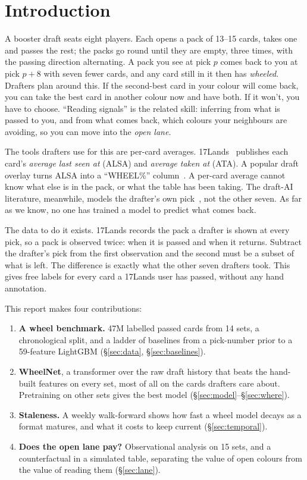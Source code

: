 \documentclass[10pt,letterpaper]{article}
\begin{document}
\section{Introduction}

A booster draft seats eight players. Each opens a pack of 13--15 cards, takes one and passes the rest; the
packs go round until they are empty, three times, with the passing direction alternating. A pack you see at
pick $p$ comes back to you at pick $p+8$ with seven fewer cards, and any card still in it then has
\emph{wheeled}. Drafters plan around this. If the second-best card in your colour will come back, you can take the
best card in another colour now and have both. If it won't, you have to choose. ``Reading signals'' is the
related skill: inferring from what is passed to you, and from what comes back, which colours your neighbours are
avoiding, so you can move into the \emph{open lane}.

The tools drafters use for this are per-card averages. 17Lands~\cite{17lands} publishes each card's
\emph{average last seen at} (ALSA) and \emph{average taken at} (ATA). A popular draft overlay turns ALSA into a
``WHEEL\%'' column~\cite{overlay}. A per-card average cannot know what else is in the pack, or what the table has
been taking. The draft-AI literature, meanwhile, models the drafter's own pick~\cite{ward2021,bertram2021,draftfm,puder},
not the other seven. As far as we know, no one has trained a model to predict what comes back.

The data to do it exists. 17Lands records the pack a drafter is shown at every pick, so a pack is observed twice:
when it is passed and when it returns. Subtract the drafter's pick from the first observation and the second must be a
subset of what is left. The difference is exactly what the other seven drafters took. This gives free labels for
every card a 17Lands user has passed, without any hand annotation.

This report makes four contributions:
\begin{enumerate}
\item \textbf{A wheel benchmark.} 47M labelled passed cards from 14 sets, a chronological split, and a ladder of
baselines from a pick-number prior to a 59-feature LightGBM (\S\ref{sec:data}, \S\ref{sec:baselines}).
\item \textbf{WheelNet}, a transformer over the raw draft history that beats the hand-built features on every set,
most of all on the cards drafters care about. Pretraining on other sets gives the best model (\S\ref{sec:model}--\S\ref{sec:where}).
\item \textbf{Staleness.} A weekly walk-forward shows how fast a wheel model decays as a format matures, and what
it costs to keep current (\S\ref{sec:temporal}).
\item \textbf{Does the open lane pay?} Observational analysis on 15 sets, and a counterfactual in a simulated table,
separating the value of open colours from the value of reading them (\S\ref{sec:lane}).
\end{enumerate}
\end{document}
